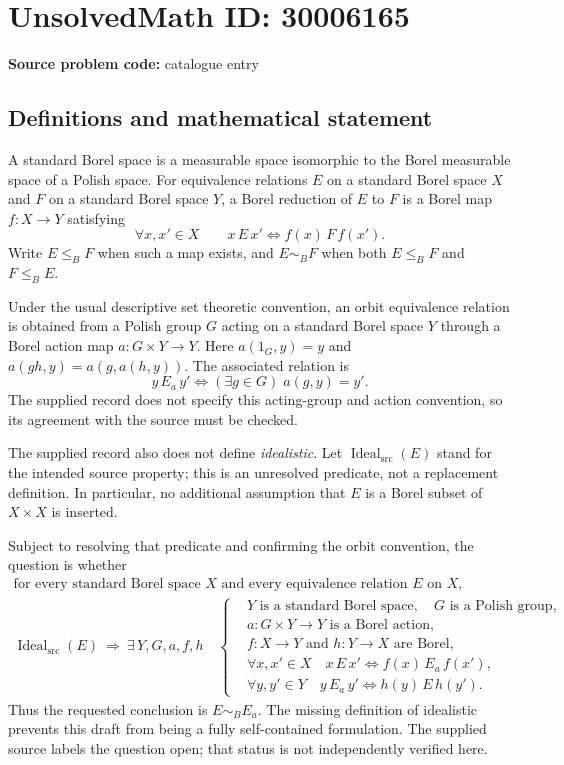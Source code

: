 \documentclass[11pt]{article}
\begin{document}
\section*{UnsolvedMath ID: 30006165}
\textbf{Source problem code:} catalogue entry
\subsection{Definitions and mathematical statement}
A standard Borel space is a measurable space isomorphic to the Borel measurable space of a Polish space. For equivalence relations \(E\) on a standard Borel space \(X\) and \(F\) on a standard Borel space \(Y\), a Borel reduction of \(E\) to \(F\) is a Borel map \(f:X\to Y\) satisfying
\[
\forall x,x'\in X\qquad x\,E\,x'\iff f(x)\,F\,f(x').
\]
Write \(E\leq_B F\) when such a map exists, and \(E\sim_B F\) when both \(E\leq_B F\) and \(F\leq_B E\).

Under the usual descriptive set theoretic convention, an orbit equivalence relation is obtained from a Polish group \(G\) acting on a standard Borel space \(Y\) through a Borel action map \(a:G\times Y\to Y\). Here \(a(1_G,y)=y\) and \(a(gh,y)=a(g,a(h,y))\). The associated relation is
\[
y\,E_a\,y'\iff (\exists g\in G)\;a(g,y)=y'.
\]
The supplied record does not specify this acting-group and action convention, so its agreement with the source must be checked.

The supplied record also does not define \emph{idealistic}. Let \(\operatorname{Ideal}_{\mathrm{src}}(E)\) stand for the intended source property; this is an unresolved predicate, not a replacement definition. In particular, no additional assumption that \(E\) is a Borel subset of \(X\times X\) is inserted.

Subject to resolving that predicate and confirming the orbit convention, the question is whether
\[
\begin{gathered}
\text{for every standard Borel space }X\text{ and every equivalence relation }E\text{ on }X,\\
\operatorname{Ideal}_{\mathrm{src}}(E)\ \Longrightarrow\
\exists\,Y,G,a,f,h\quad
\left\{
\begin{aligned}
&Y\text{ is a standard Borel space},\quad G\text{ is a Polish group},\\
&a:G\times Y\to Y\text{ is a Borel action},\\
&f:X\to Y\text{ and }h:Y\to X\text{ are Borel},\\
&\forall x,x'\in X\quad
x\,E\,x'\iff f(x)\,E_a\,f(x'),\\
&\forall y,y'\in Y\quad
y\,E_a\,y'\iff h(y)\,E\,h(y').
\end{aligned}
\right.
\end{gathered}
\]
Thus the requested conclusion is \(E\sim_B E_a\). The missing definition of idealistic prevents this draft from being a fully self-contained formulation. The supplied source labels the question open; that status is not independently verified here.
\end{document}
